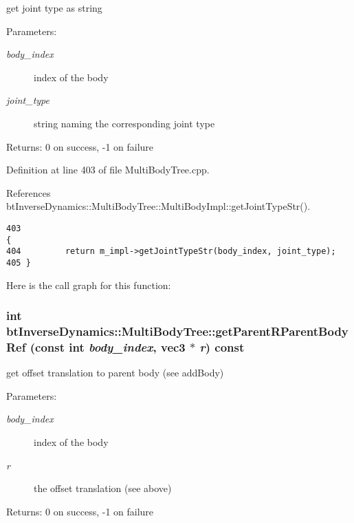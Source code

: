 get joint type as string \begin{Desc}
\item[Parameters:]
\begin{description}
\item[{\em body\_\-index}]index of the body \item[{\em joint\_\-type}]string naming the corresponding joint type \end{description}
\end{Desc}
\begin{Desc}
\item[Returns:]0 on success, -1 on failure \end{Desc}


Definition at line 403 of file MultiBodyTree.cpp.

References btInverseDynamics::MultiBodyTree::MultiBodyImpl::getJointTypeStr().

\begin{Code}\begin{verbatim}403                                                                                       {
404         return m_impl->getJointTypeStr(body_index, joint_type);
405 }
\end{verbatim}
\end{Code}




Here is the call graph for this function:\hypertarget{classbt_inverse_dynamics_1_1_multi_body_tree_d7b1596a98a55cd32c3af072a82dcade}{
\subsubsection[getParentRParentBodyRef]{\setlength{\rightskip}{0pt plus 5cm}int btInverseDynamics::MultiBodyTree::getParentRParentBodyRef (const int {\em body\_\-index}, \/  {\bf vec3} $\ast$ {\em r}) const}}
\label{classbt_inverse_dynamics_1_1_multi_body_tree_d7b1596a98a55cd32c3af072a82dcade}


get offset translation to parent body (see addBody) \begin{Desc}
\item[Parameters:]
\begin{description}
\item[{\em body\_\-index}]index of the body \item[{\em r}]the offset translation (see above) \end{description}
\end{Desc}
\begin{Desc}
\item[Returns:]0 on success, -1 on failure \end{Desc}



